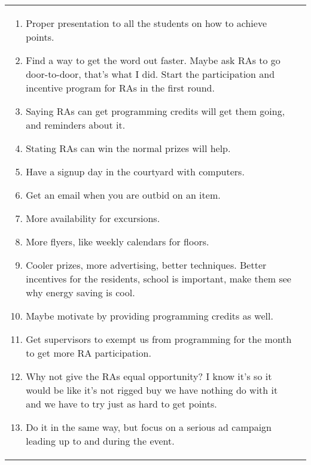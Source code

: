 \documentclass[]{IEEEconf}
\begin{document}
\begin{figure*}[th!]
\begin{tabular}{|l|l|}
\begin{minipage}[t]{3.5in}
\begin{enumerate}
\item Proper presentation to all the students on how to achieve points. 
\item Find a way to get the word out faster.  Maybe ask RAs to go door-to-door, that's what I did.   Start the 
participation and incentive program for RAs in the first round.
\item Saying RAs can get programming credits will get them going, and reminders about it. 
\item Stating RAs can win the normal prizes will help.
\item Have a signup day in the courtyard with computers.
\item Get an email when you are outbid on an item. 
\item More availability for excursions.
\item More flyers, like weekly calendars for floors. 
\item Cooler prizes, more advertising, better techniques.  Better incentives for the residents, school is important, make them see why energy saving is cool.
\item Maybe motivate by providing programming credits as well. 
\item Get supervisors to exempt us from programming for the month to get more RA participation.
\item Why not give the RAs equal opportunity?  I know it's so it would be like it's not rigged buy we have nothing do with it and we have to try just as hard to get points.
\item Do it in the same way, but focus on a serious ad campaign leading up to and during the event.
\end{enumerate}
\end{minipage}  \normalsize

&


\end{tabular}
\end{figure*}
\end{document}

